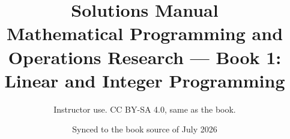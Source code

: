 %
%
\documentclass[11pt]{article}
\usepackage[margin=1in]{geometry}
\usepackage{amsmath, amssymb}
\usepackage{xcolor}
\usepackage[most]{tcolorbox}
\usepackage[colorlinks=true, urlcolor=blue!60!black, linkcolor=blue!50!black]{hyperref}
\usepackage{enumitem}

\newcommand{\st}{\text{s.t.}\;\;}
\renewcommand{\b}{\mathbf{b}}
\renewcommand{\c}{\mathbf{c}}
\newcommand{\x}{\mathbf{x}}
\newcommand{\y}{\mathbf{y}}
\newcommand{\A}{\mathbf{A}}

\newcommand{\exsol}[3]{\subsection*{Exercise #1\ifx\relax#2\relax\else\ (#2)\fi\hfill{\normalsize\color{orange!85!black}\ifcase#3\relax\or$\star$\or$\star\star$\or$\star\star\star$\fi}}}

\title{\textbf{Solutions Manual}\\ \large Mathematical Programming and Operations Research --- Book 1:\\ Linear and Integer Programming}
\author{Instructor use. CC BY-SA 4.0, same as the book.}
\date{Synced to the book source of July 2026}


\maketitle
\tableofcontents
\newpage



















